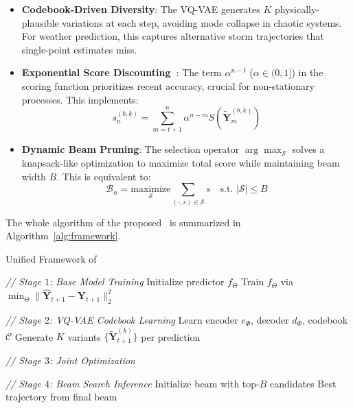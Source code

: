 \begin{itemize}
\item \textbf{Codebook-Driven Diversity}: The VQ-VAE generates $K$ physically-plausible variations at each step, avoiding mode collapse in chaotic systems. For weather prediction, this captures alternative storm trajectories that single-point estimates miss.

\item \textbf{Exponential Score Discounting~\cite{wang2024nuwadynamics}}: The term $\alpha^{n-t}$ ($\alpha \in (0,1]$) in the scoring function prioritizes recent accuracy, crucial for non-stationary processes. This implements:
\begin{equation}
s_n^{(b,k)} = \sum_{m=t+1}^n \alpha^{n-m} S(\tilde{\mathbf{Y}}_m^{(b,k)})
\end{equation}
\item \textbf{Dynamic Beam Pruning}: The selection operator $\arg\max_{\mathcal{S}}$ solves a knapsack-like optimization to maximize total score while maintaining beam width $B$. This is equivalent to:
\begin{equation}
\mathcal{B}_n = \underset{\mathcal{S}}{\text{maximize}} \sum_{(\cdot,s)\in\mathcal{S}} s \quad \text{s.t. } |\mathcal{S}| \leq B
\end{equation}
\end{itemize}
The whole algorithm of the proposed~\method{} is summarized in Algorithm~\ref{alg:framework}.
\begin{algorithm}[h]
\SetAlgoLined
\DontPrintSemicolon
\caption{Unified Framework of \method{}}\label{alg:framework}

\emph{// Stage $1$: Base Model Training}\;
Initialize predictor $f_\Theta$ \;
Train $f_\Theta$ via $\min_\Theta \|\hat{\mathbf{Y}}_{t+1} - \mathbf{Y}_{t+1}\|_2^2$\;

\emph{// Stage $2$: VQ-VAE Codebook Learning}\;
Learn encoder $e_\Phi$, decoder $d_\Phi$, codebook $\mathcal{C}$\;
Generate $K$ variants $\{\tilde{\mathbf{Y}}_{t+1}^{(k)}\}$ per prediction\;

\emph{// Stage $3$: Joint Optimization}\;

\emph{// Stage $4$: Beam Search Inference}\;
Initialize beam with top-$B$ candidates\;
\Return Best trajectory from final beam\;
\end{algorithm}